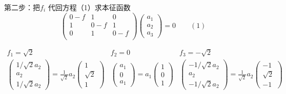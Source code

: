 \begin{frame} 
    第二步：把$f_i$ 代回方程（1）求本征函数
    $$\begin{pmatrix}
        0-f & 1 & 0  \\
        1 & 0-f & 1  \\
        0 & 1 & 0-f \\
     \end{pmatrix} 
     \begin{pmatrix}
         a_1\\
         a_2\\
         a_3
     \end{pmatrix}
     =0 \qquad (1)$$

     $$\begin{matrix}
       f_1=\sqrt{2} & f_2=0  &  f_3=-\sqrt{2}\\
    \begin{pmatrix}
        1/\sqrt{2}a_2\\
        a_2\\
        1/\sqrt{2}a_2
    \end{pmatrix}  
    = \frac{1}{\sqrt{2}} a_2\begin{pmatrix}
        1\\
        \sqrt{2}\\
        1
        \end{pmatrix} 
    & 
    \begin{pmatrix}
        a_1\\
        0\\
        a_1
    \end{pmatrix}  
    =  a_1 \begin{pmatrix}
        1\\
        0\\
        1
    \end{pmatrix}
    &
    \begin{pmatrix}
        -1/\sqrt{2}a_2\\
        a_2\\
        -1/\sqrt{2}a_2
    \end{pmatrix} 
    = \frac{1}{\sqrt{2}} a_2 \begin{pmatrix}
        -1\\
        \sqrt{2}\\
        -1
    \end{pmatrix} 
    \end{matrix}$$           
\end{frame}


